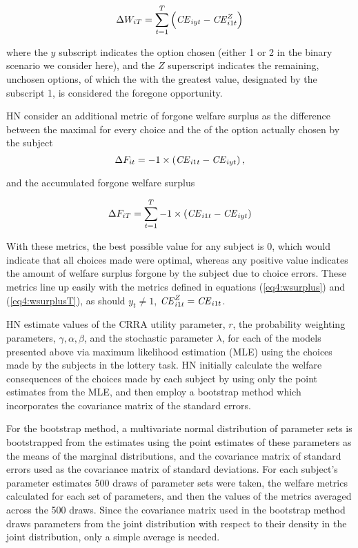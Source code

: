 \documentclass[../main.tex]{subfiles}
\begin{document}
\begin{equation}
	\label{eq4:wsurplusT}
	\Delta W_{iT} = \sum_{t=1}^T \left( {\mathit{CE}}_{iyt} - {\mathit{CE}}_{i1t}^Z \right)
\end{equation}

\noindent where the $y$ subscript indicates the option chosen (either 1 or 2 in the binary scenario we consider here), and the $Z$ superscript indicates the remaining, unchosen options, of which the {\CE} with the greatest value, designated by the subscript 1, is considered the foregone opportunity.

HN \parencite*[106]{Harrison2016} consider an additional metric of forgone welfare surplus as the difference between the maximal {\CE} for every choice and the {\CE} of the option actually chosen by the subject
\begin{equation}
	\label{eq4:wforgone}
	\Delta F_{it} = -1 \times \left( {\mathit{CE}}_{i1t} - {\mathit{CE}}_{iyt} \right) , 
\end{equation}

\noindent and the accumulated forgone welfare surplus

\begin{equation}
	\label{eq4:wforgoneT}
	\Delta F_{iT} = \sum_{t=1}^T  -1 \times \left( {\mathit{CE}}_{i1t} - {\mathit{CE}}_{iyt} \right)
\end{equation}

\noindent With these metrics, the best possible value for any subject is 0, which would indicate that all choices made were optimal, whereas any positive value indicates the amount of welfare surplus forgone by the subject due to choice errors.
These metrics line up easily with the metrics defined in equations (\ref{eq4:wsurplus}) and (\ref{eq4:wsurplusT}), as should $y_t \neq 1$, ${\mathit{CE}}_{i1t}^Z = {\mathit{CE}}_{i1t}$.

HN estimate values of the CRRA utility parameter, $r$, the probability weighting parameters, $\gamma, \alpha, \beta$, and the stochastic parameter $\lambda$, for each of the models presented above via maximum likelihood estimation (MLE) using the choices made by the subjects in the lottery task.
HN \parencite*[107,110]{Harrison2016} initially calculate the welfare consequences of the choices made by each subject by using only the point estimates from the MLE, and then employ a bootstrap method which incorporates the covariance matrix of the standard errors.

For the bootstrap method, a multivariate normal distribution of parameter sets is bootstrapped from the estimates using the point estimates of these parameters as the means of the marginal distributions, and the covariance matrix of standard errors used as the covariance matrix of standard deviations.
For each subject's parameter estimates 500 draws of parameter sets were taken, the welfare metrics calculated for each set of parameters, and then the values of the metrics averaged across the 500 draws.
Since the covariance matrix used in the bootstrap method draws parameters from the joint distribution with respect to their density in the joint distribution, only a simple average is needed.
\end{document}
